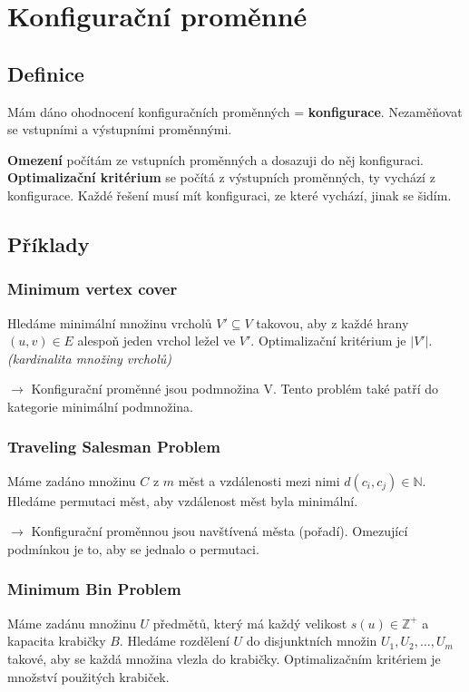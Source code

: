 \section{Konfigurační proměnné}

\subsection{Definice}

Mám dáno ohodnocení konfiguračních proměnných = \textbf{konfigurace}. Nezaměňovat se vstupními a výstupními proměnnými.

\textbf{Omezení} počítám ze vstupních proměnných a dosazuji do něj konfiguraci. \textbf{Optimalizační kritérium} se počítá z výstupních proměnných, ty vychází z konfigurace. Každé řešení musí mít konfiguraci, ze které vychází, jinak se šidím.

\subsection{Příklady}

\subsubsection{Minimum vertex cover}

Hledáme minimální množinu vrcholů $V' \subseteq V$ takovou, aby z každé hrany $(u,v) \in E$ alespoň jeden vrchol ležel ve $V'$. Optimalizační kritérium je $|V'|$. \textit{(kardinalita množiny vrcholů)}

$\to$ Konfigurační proměnné jsou podmnožina V. Tento problém také patří do kategorie minimální podmnožina.

\subsubsection{Traveling Salesman Problem}

Máme zadáno množinu $C$ z $m$ měst a vzdálenosti mezi nimi $d(c_i, c_j) \in \mathbb{N}$. Hledáme permutaci měst, aby vzdálenost měst byla minimální.

$\to$ Konfigurační proměnnou jsou navštívená města (pořadí). Omezující podmínkou je to, aby se jednalo o permutaci.

\subsubsection{Minimum Bin Problem}

Máme zadánu množinu $U$ předmětů, který má každý velikost $s(u) \in \mathbb{Z}^+$ a kapacita krabičky $B$. Hledáme rozdělení $U$ do disjunktních množin $U_1, U_2, \ldots, U_m$ takové, aby se každá množina vlezla do krabičky. Optimalizačním kritériem je množství použitých krabiček.

